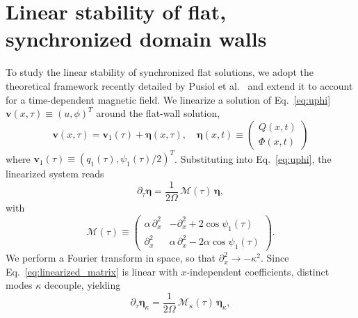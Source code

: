 \documentclass[prb,aps,twocolumn,superscriptaddress,floatfix]{revtex4-1}
\newcommand{\luzcom}[1]{{\color{green!50!black}#1}}
\begin{document}

\section{Linear stability of flat, synchronized domain walls}
\label{sec:linearstabilitydiagrams}

To study the linear stability of synchronized flat solutions, we adopt the theoretical framework recently detailed by Pusiol et al.~\cite{pusiol2026deterministic} and extend it to account for a time-dependent magnetic field. We linearize a solution of Eq.~\eqref{eq:uphi} $\mathbf{v}(x,\tau)\equiv(u,\phi)^{T}$ around the flat-wall solution,
%
\begin{equation}
    \mathbf{v}(x,\tau) = \mathbf{v}_{1}(\tau) + \boldsymbol{\eta}(x,\tau), \quad \boldsymbol{\eta}(x,t) \equiv \begin{pmatrix} Q(x,t) \\ \Phi(x,t) \end{pmatrix}
\end{equation}
%
where $\mathbf{v}_{1}(\tau)\equiv(q_{1}(\tau),\psi_1(\tau)/2)^{T}$. Substituting into Eq.~\eqref{eq:uphi}, the linearized system reads
%
\begin{equation}
    \partial_\tau \boldsymbol{\eta} = \frac{1}{2\Omega}\,\mathcal{M}(\tau)\,\boldsymbol{\eta},
    \label{eq:linearized_matrix}
\end{equation}
%
with
%
\begin{equation}
    \mathcal{M}(\tau) \equiv
    \begin{pmatrix}
    \alpha\,\partial_x^2 & -\partial_x^2+2\cos\psi_1(\tau) \\
    \partial_x^2 & \alpha\,\partial_x^2-2\alpha\cos\psi_1(\tau)
    \end{pmatrix}.
    \label{eq:stability_matrix}
\end{equation}
%
We perform a Fourier transform in space, so that $\partial_x^2\to-\kappa^2$. Since Eq.~\eqref{eq:linearized_matrix} is linear with $x$-independent coefficients, distinct modes $\kappa$ decouple, yielding
%
\begin{equation}
    \partial_\tau \boldsymbol{\eta}_\kappa = \frac{1}{2\Omega}\,\mathcal{M}_\kappa(\tau)\,\boldsymbol{\eta}_\kappa,
    \label{eq:linearized_mode}
\end{equation}
\end{document}
